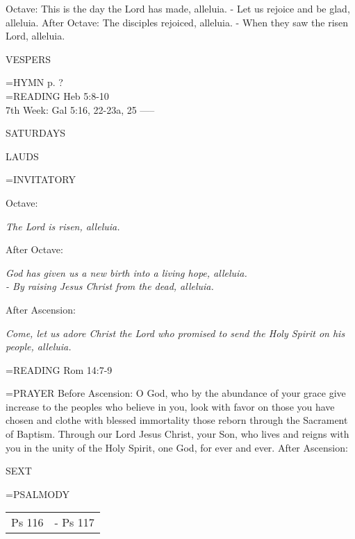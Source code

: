 Octave:	This is the day the Lord has made, alleluia.
		- Let us rejoice and be glad, alleluia.
After Octave:	The disciples rejoiced, alleluia.
		- When they saw the risen Lord, alleluia.

\begin{flushleft}\normalsize VESPERS\\\end{flushleft}
\hangindent=\parindent \small{\uppercase{HYMN} p.  ?\\}
\hangindent=\parindent \small{READING}    Heb 5:8-10 \textbf{   \\}
7th Week:	Gal 5:16, 22-23a, 25    
-----
\begin{center}
\normalsize SATURDAYS
\end{center}

\begin{flushleft}\normalsize LAUDS\\\end{flushleft}
\hangindent=\parindent \small{INVITATORY}
\begin{center}
\end{center}Octave:\begin{center}\textit{	The Lord is risen, alleluia.\\}
\end{center}After Octave:\begin{center}\textit{	God has given us a new birth into a living hope, alleluia.\\}
\textit{		- By raising Jesus Christ from the dead, alleluia.\\}
\end{center}After Ascension:\begin{center}\textit{	Come, let us adore Christ the Lord who promised to send the Holy Spirit on his people, alleluia.\\}
\end{center}

\hangindent=\parindent \small{READING}    Rom 14:7-9 \textbf{   \\}

\hangindent=\parindent \small{PRAYER }
Before Ascension:	O God, who by the abundance of your grace give increase to the peoples who believe in you, look with favor on those you have chosen and clothe with blessed immortality those reborn through the Sacrament of Baptism. Through our Lord Jesus Christ, your Son, who lives and reigns with you in the unity of the Holy Spirit, one God, for ever and ever.
After Ascension:	

\begin{flushleft}\normalsize SEXT\\\end{flushleft}
\hangindent=\parindent \small{PSALMODY}
\begin{center}
\begin{tabular}{ l l }
Ps 116 &  - Ps 117\\
\end{tabular}
\end{center}		

